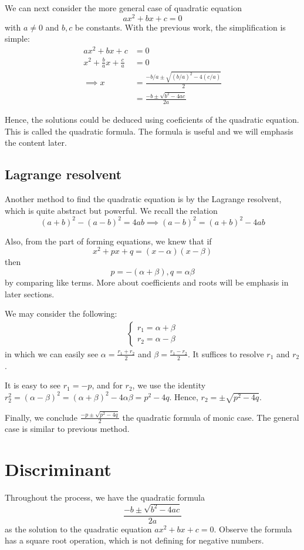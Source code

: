 \documentclass[12pt]{article}
\begin{document}
    We can next consider the more general case of quadratic equation $$ax^2+bx+c=0$$ with $a\neq 0$ and $b,c$ be constants. With the previous work, the simplification is simple:
    \begin{align*}
        ax^2+bx+c&=0\\
        x^2+\frac{b}{a}x+\frac{c}{a}&=0\\
        \implies x&=\frac{-b/a\pm\sqrt{(b/a)^2-4(c/a)}}{2}\\
        &=\frac{-b\pm\sqrt{b^2-4ac}}{2a}
    \end{align*}

    Hence, the solutions could be deduced using coeficients of the quadratic equation. This is called the quadratic formula. The formula is useful and we will emphasis the content later.

    \subsection*{Lagrange resolvent}
    Another method to find the quadratic equation is by the Lagrange resolvent, which is quite abstract but powerful. We recall the relation $$(a+b)^2-(a-b)^2=4ab\implies(a-b)^2=(a+b)^2-4ab$$
    
    Also, from the part of forming equations, we knew that if $$x^2+px+q=(x-\alpha)(x-\beta)$$ then $$p=-(\alpha+\beta), q=\alpha\beta$$ by comparing like terms. More about coefficients and roots will be emphasis in later sections.

    We may consider the following:
    \begin{align*}
        \begin{cases}
            r_1=\alpha+\beta\\
            r_2=\alpha-\beta
        \end{cases}
    \end{align*}
    in which we can easily see $\alpha=\frac{r_1+r_2}{2}$ and $\beta=\frac{r_1-r_2}{2}$. It suffices to resolve $r_1$ and $r_2$. 

    It is easy to see $r_1=-p$, and for $r_2$, we use the identity $r_2^2=(\alpha-\beta)^2=(\alpha+\beta)^2-4\alpha\beta=p^2-4q$. Hence, $r_2=\pm\sqrt{p^2-4q}$.

    Finally, we conclude $\frac{-p\pm\sqrt{p^2-4q}}{2}$ the quadratic formula of monic case. The general case is similar to previous method.

    \section*{Discriminant}
    Throughout the process, we have the quadratic formula $$\frac{-b\pm\sqrt{b^2-4ac}}{2a}$$ as the solution to the quadratic equation $ax^2+bx+c=0$. Observe the formula has a square root operation, which is not defining for negative numbers.
\end{document}
